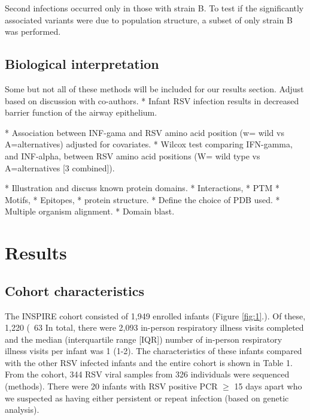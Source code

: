 \documentclass{article}
\begin{document}
Second infections occurred only in those with strain B. 
To test if the significantly associated variants were due to population structure, 
a subset of only strain B was performed. 

\subsection{Biological interpretation}
Some but not all of these methods will be included for our results section. 
Adjust based on discussion with co-authors.
* Infant RSV infection results in decreased barrier function of the airway epithelium.

* Association between INF-gama and RSV amino acid position (w= wild vs A=alternatives) adjusted for covariates.
* Wilcox test comparing IFN-gamma, and INF-alpha, between RSV amino acid positions (W= wild type vs A=alternatives [3 combined]).

* Illustration and discuss known protein domains.
* Interactions,
* PTM
* Motifs,
* Epitopes,
* protein structure.
* Define the choice of PDB used. 
* Multiple organism alignment. 
* Domain blast.

\section{Results}
\subsection{Cohort characteristics}
The INSPIRE cohort consisted of 1,949 enrolled infants 
(Figure \ref{fig:1}.).
Of these, 1,220 (~63%
In total, there were 2,093 in-person respiratory illness visits completed and the median (interquartile range [IQR]) number of in-person respiratory illness visits per infant was 1 (1-2). 
The characteristics of these infants compared with the other RSV infected infants and the entire cohort is shown in Table 1.
From the cohort, 344 RSV viral samples from 326 individuals were sequenced (methods).
There were 20 infants with RSV positive PCR $\ge$ 15 days apart who we suspected as having either persistent or repeat infection (based on genetic analysis).
\end{document}
